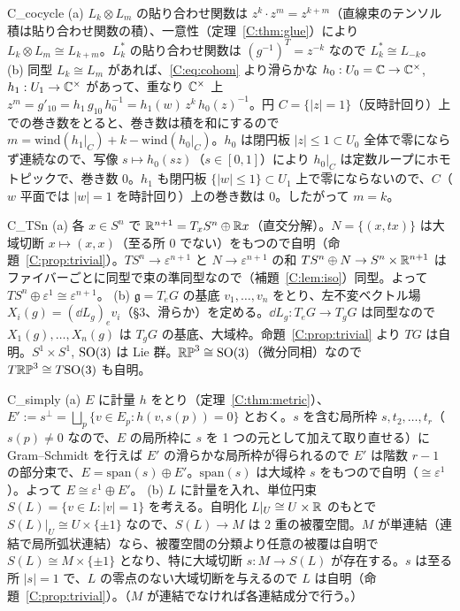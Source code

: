 \begin{soll}{C_cocycle}
(a) $L_k\otimes L_m$ の貼り合わせ関数は $z^k\cdot z^m=z^{k+m}$（直線束のテンソル積は貼り合わせ関数の積）、一意性（定理~\ref{C:thm:glue}）により $L_k\otimes L_m\cong L_{k+m}$。$L_k^*$ の貼り合わせ関数は $(g^{-1})^T=z^{-k}$ なので $L_k^*\cong L_{-k}$。
(b) 同型 $L_k\cong L_m$ があれば、\eqref{C:eq:cohom} より滑らかな $h_0:U_0=\mathbb C\to\mathbb C^\times$, $h_1:U_1\to\mathbb C^\times$ があって、重なり $\mathbb C^\times$ 上 $z^m=g'_{10}=h_1\,g_{10}\,h_0^{-1}=h_1(w)\,z^k\,h_0(z)^{-1}$。円 $C=\{|z|=1\}$（反時計回り）上での巻き数をとると、巻き数は積を和にするので $m=\mathrm{wind}(h_1|_C)+k-\mathrm{wind}(h_0|_C)$。$h_0$ は閉円板 $|z|\le1\subset U_0$ 全体で零にならず連続なので、写像 $s\mapsto h_0(sz)$（$s\in[0,1]$）により $h_0|_C$ は定数ループにホモトピックで、巻き数 $0$。$h_1$ も閉円板 $\{|w|\le1\}\subset U_1$ 上で零にならないので、$C$（$w$ 平面では $|w|=1$ を時計回り）上の巻き数は $0$。したがって $m=k$。
\end{soll}


\begin{soll}{C_TSn}
(a) 各 $x\in S^n$ で $\mathbb R^{n+1}=T_xS^n\oplus\mathbb R x$（直交分解）。$N=\{(x,tx)\}$ は大域切断 $x\mapsto(x,x)$（至る所 $0$ でない）をもつので自明（命題~\ref{C:prop:trivial}）。$TS^n\to\varepsilon^{n+1}$ と $N\to\varepsilon^{n+1}$ の和 $TS^n\oplus N\to S^n\times\mathbb R^{n+1}$ はファイバーごとに同型で束の準同型なので（補題~\ref{C:lem:iso}）同型。よって $TS^n\oplus\varepsilon^1\cong\varepsilon^{n+1}$。
(b) $\mathfrak g=T_eG$ の基底 $v_1,\dots,v_n$ をとり、左不変ベクトル場 $X_i(g)=(\dd L_g)_ev_i$（§3、滑らか）を定める。$\dd L_g:T_eG\to T_gG$ は同型なので $X_1(g),\dots,X_n(g)$ は $T_gG$ の基底、大域枠。命題~\ref{C:prop:trivial} より $TG$ は自明。$S^1\times S^1$, $\mathrm{SO}(3)$ は Lie 群。$\mathbb{RP}^3\cong\mathrm{SO}(3)$（微分同相）なので $T\mathbb{RP}^3\cong T\mathrm{SO}(3)$ も自明。
\end{soll}


\begin{soll}{C_simply}
(a) $E$ に計量 $h$ をとり（定理~\ref{C:thm:metric}）、$E':=s^\perp=\bigsqcup_p\{v\in E_p:h(v,s(p))=0\}$ とおく。$s$ を含む局所枠 $s,t_2,\dots,t_r$（$s(p)\ne0$ なので、$E$ の局所枠に $s$ を 1 つの元として加えて取り直せる）に Gram--Schmidt を行えば $E'$ の滑らかな局所枠が得られるので $E'$ は階数 $r-1$ の部分束で、$E=\mathrm{span}(s)\oplus E'$。$\mathrm{span}(s)$ は大域枠 $s$ をもつので自明（$\cong\varepsilon^1$）。よって $E\cong\varepsilon^1\oplus E'$。
(b) $L$ に計量を入れ、単位円束 $S(L)=\{v\in L:|v|=1\}$ を考える。自明化 $L|_U\cong U\times\mathbb R$ のもとで $S(L)|_U\cong U\times\{\pm1\}$ なので、$S(L)\to M$ は 2 重の被覆空間。$M$ が単連結（連結で局所弧状連結）なら、被覆空間の分類より任意の被覆は自明で $S(L)\cong M\times\{\pm1\}$ となり、特に大域切断 $s:M\to S(L)$ が存在する。$s$ は至る所 $|s|=1$ で、$L$ の零点のない大域切断を与えるので $L$ は自明（命題~\ref{C:prop:trivial}）。（$M$ が連結でなければ各連結成分で行う。）
\end{soll}


